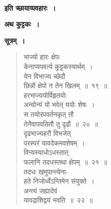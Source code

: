 \documentclass[11pt, openany]{book}
\begin{document}
\begin{center}
\\
\vspace{8mm}

\textbf{इति च्छायाव्यवहारः~।}
\end{center}

 \newpage

 \label{ch9}
\begin{center}
{\large \textbf{अथ कुट्टकः~।}}
\end{center}
\textbf{\textbf{सूत्रम्~।}}

 \label{9.20}
\begin{quote}
{\gk भाज्यो हारः क्षेपः\\
केनाप्यपवर्त्य कुट्टकस्यार्थम्~।\\
येन विभाज्य च्छेदौ\\
छिन्नौ क्षेपो न तेन खिलम्~॥~१९~॥\\
हरभाज्ययोर्विहृतयोः\\
अन्योन्यं यो भवेत् ययोः शेषः~।\\
स तयोरपवर्तनकृत् तौ\\
तेनैवापवतितौ तु दृढौ~॥~२०~॥\\
दृढभाज्यहरौ विभजेत्\\
परस्परं यावदेकमवशेषम्~।\\
विन्यस्याधोऽधस्तात्\\
फलानि तदधस्तथा क्षेपम्~॥~२१~॥\\
तदधः खमुपान्त्येना-\\
हते निजोर्ध्वेऽन्तिमेन संयुक्ते~।\\
अन्त्यं जह्यादेवं\\
यावद्राशिद्वयं भवति~॥~२२~॥	}
\end{quote}
\end{document}
